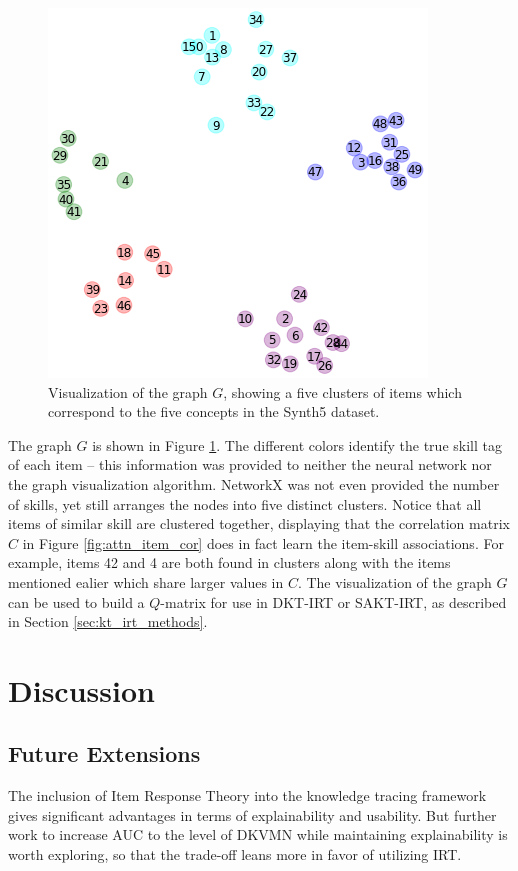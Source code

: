 \begin{figure}[h]
  \centering
  \includegraphics[width=.55\textwidth]{img/kt_irt/synth5_clusters_no_ffn.png}
  \caption{Visualization of the graph $G$, showing a five clusters of items which correspond to the five concepts in the Synth5 dataset.}
  \label{fig:synth5_clusters}
\end{figure}
The graph $G$ is shown in Figure \ref{fig:synth5_clusters}. The different colors identify the true skill tag of each item -- this information was provided to neither the neural network nor the graph visualization algorithm. NetworkX was not even provided the number of skills, yet still arranges the nodes into five distinct clusters. Notice that all items of similar skill are clustered together, displaying that the correlation matrix $C$ in Figure \ref{fig:attn_item_cor} does in fact learn the item-skill associations. For example, items 42 and 4 are both found in clusters along with the items mentioned ealier which share larger values in $C$. The visualization of the graph $G$ can be used to build a $Q$-matrix for use in DKT-IRT or SAKT-IRT, as described in Section \ref{sec:kt_irt_methods}.

\section{Discussion}

\subsection{Future Extensions}\label{sec:kt_future}
The inclusion of Item Response Theory into the knowledge tracing framework gives significant advantages in terms of explainability and usability. But further work to increase AUC to the level of DKVMN while maintaining explainability is worth exploring, so that the trade-off leans more in favor of utilizing IRT. 

